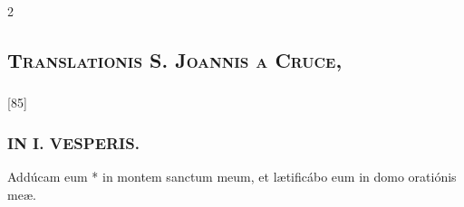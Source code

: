 \documentclass[9pt,twoside]{extarticle}
\begin{document}
\begin{multicols}{2}
\subsection*{\center {}}
\subsection*{\center \textsc{Translationis S. Joannis a Cruce,}}
\subsubsection*{\center {}}

\begin{tightlist}{}
\item {} [85] 
\end{tightlist}

\subsubsection*{\center \textsc{IN I. VESPERIS.}}
\begin{tightlist}{}
\item {} Addúcam eum * in montem sanctum meum, et lætificábo eum in domo oratiónis meæ.
\item {}
\end{tightlist}


\end{multicols}
\end{document}
